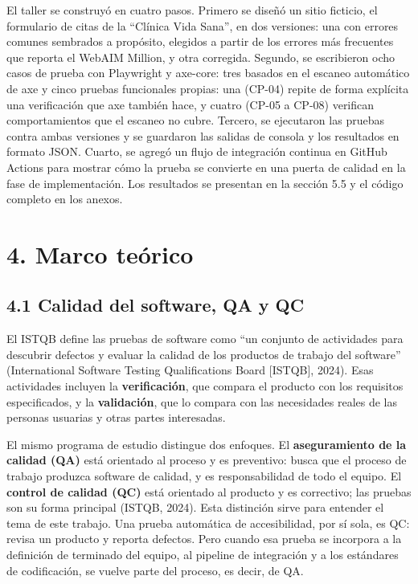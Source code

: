 \documentclass[10pt,letterpaper,onecolumn]{IEEEtran}
\begin{document}
El taller se construyó en cuatro pasos. Primero se diseñó un sitio ficticio, el formulario de citas de la ``Clínica Vida Sana'', en dos versiones: una con errores comunes sembrados a propósito, elegidos a partir de los errores más frecuentes que reporta el WebAIM Million, y otra corregida. Segundo, se escribieron ocho casos de prueba con Playwright y axe-core: tres basados en el escaneo automático de axe y cinco pruebas funcionales propias: una (CP-04) repite de forma explícita una verificación que axe también hace, y cuatro (CP-05 a CP-08) verifican comportamientos que el escaneo no cubre. Tercero, se ejecutaron las pruebas contra ambas versiones y se guardaron las salidas de consola y los resultados en formato JSON. Cuarto, se agregó un flujo de integración continua en GitHub Actions para mostrar cómo la prueba se convierte en una puerta de calidad en la fase de implementación. Los resultados se presentan en la sección 5.5 y el código completo en los anexos.

\section{4. Marco teórico}\label{marco-teuxf3rico}

\subsection{4.1 Calidad del software, QA y QC}\label{calidad-del-software-qa-y-qc}

El ISTQB define las pruebas de software como ``un conjunto de actividades para descubrir defectos y evaluar la calidad de los productos de trabajo del software'' (International Software Testing Qualifications Board {[}ISTQB{]}, 2024). Esas actividades incluyen la \textbf{verificación}, que compara el producto con los requisitos especificados, y la \textbf{validación}, que lo compara con las necesidades reales de las personas usuarias y otras partes interesadas.

El mismo programa de estudio distingue dos enfoques. El \textbf{aseguramiento de la calidad (QA)} está orientado al proceso y es preventivo: busca que el proceso de trabajo produzca software de calidad, y es responsabilidad de todo el equipo. El \textbf{control de calidad (QC)} está orientado al producto y es correctivo; las pruebas son su forma principal (ISTQB, 2024). Esta distinción sirve para entender el tema de este trabajo. Una prueba automática de accesibilidad, por sí sola, es QC: revisa un producto y reporta defectos. Pero cuando esa prueba se incorpora a la definición de terminado del equipo, al pipeline de integración y a los estándares de codificación, se vuelve parte del proceso, es decir, de QA.
\end{document}
